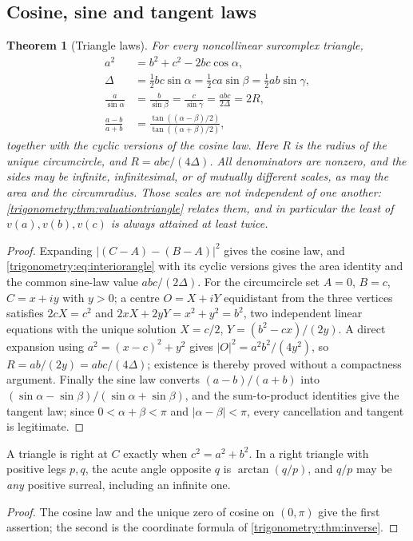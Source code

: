\documentclass[11pt,letterpaper]{article}
\numberwithin{equation}{section}
\newtheorem{theorem}{Theorem}[section]
\theoremstyle{definition}
\theoremstyle{remark}
\begin{document}
\subsection{Cosine, sine and tangent laws}
\begin{theorem}[Triangle laws]\label{trigonometry:thm:trianglelaws}
For every noncollinear surcomplex triangle,
\begin{align}
 a^2&=b^2+c^2-2bc\cos\alpha,\\
 \Delta&=\tfrac12bc\sin\alpha=\tfrac12ca\sin\beta=\tfrac12ab\sin\gamma,\\
 \frac a{\sin\alpha}&=\frac b{\sin\beta}=\frac c{\sin\gamma}=\frac{abc}{2\Delta}=2R,\\
 \frac{a-b}{a+b}&=\frac{\tan((\alpha-\beta)/2)}{\tan((\alpha+\beta)/2)},
 \label{trigonometry:eq:trianglelaws}
\end{align}
together with the cyclic versions of the cosine law. Here $R$ is the radius of the unique
circumcircle, and $R=abc/(4\Delta)$. All denominators are nonzero, and the sides may be infinite,
infinitesimal, or of mutually different scales, as may the area and the circumradius.  Those
scales are not independent of one another: \cref{trigonometry:thm:valuationtriangle} relates
them, and in particular the least of $v(a),v(b),v(c)$ is always attained at least twice.
\end{theorem}
\begin{proof}
Expanding $|(C-A)-(B-A)|^2$ gives the cosine law, and \cref{trigonometry:eq:interiorangle} with its
cyclic versions gives the area identity and the common sine-law value $abc/(2\Delta)$. For the
circumcircle set $A=0$, $B=c$, $C=x+iy$ with $y>0$; a centre $O=X+iY$ equidistant from the three
vertices satisfies $2cX=c^2$ and $2xX+2yY=x^2+y^2=b^2$, two independent linear equations with the
unique solution $X=c/2$, $Y=(b^2-cx)/(2y)$. A direct expansion using $a^2=(x-c)^2+y^2$ gives
$|O|^2=a^2b^2/(4y^2)$, so $R=ab/(2y)=abc/(4\Delta)$; existence is thereby proved without a
compactness argument. Finally the sine law converts $(a-b)/(a+b)$ into
$(\sin\alpha-\sin\beta)/(\sin\alpha+\sin\beta)$, and the sum-to-product identities give the tangent
law; since $0<\alpha+\beta<\pi$ and $|\alpha-\beta|<\pi$, every cancellation and tangent is
legitimate.
\end{proof}

\begin{corollary}\label{trigonometry:cor:right}
A triangle is right at $C$ exactly when $c^2=a^2+b^2$. In a right triangle with positive legs
$p,q$, the acute angle opposite $q$ is $\arctan(q/p)$, and $q/p$ may be \emph{any} positive
surreal, including an infinite one.
\end{corollary}
\begin{proof}
The cosine law and the unique zero of cosine on $(0,\pi)$ give the first assertion; the second is
the coordinate formula of \cref{trigonometry:thm:inverse}.
\end{proof}
\end{document}
